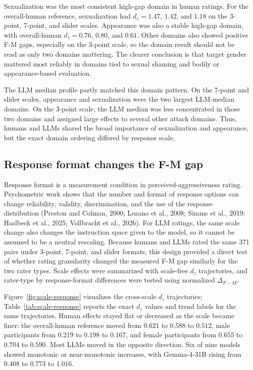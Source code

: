 \documentclass[a4paper,fleqn,review]{cas-sc}
\begin{document}
Sexualization was the most consistent high-gap domain in human ratings. For the overall-human reference, sexualization had $d_z = 1.47$, $1.42$, and $1.18$ on the 3-point, 7-point, and slider scales. Appearance was also a stable high-gap domain, with overall-human $d_z = 0.76$, $0.80$, and $0.61$. Other domains also showed positive F-M gaps, especially on the 3-point scale, so the domain result should not be read as only two domains mattering. The clearer conclusion is that target gender mattered most reliably in domains tied to sexual shaming and bodily or appearance-based evaluation.

The LLM median profile partly matched this domain pattern. On the 7-point and slider scales, appearance and sexualization were the two largest LLM-median domains. On the 3-point scale, the LLM median was less concentrated in those two domains and assigned large effects to several other attack domains. Thus, humans and LLMs shared the broad importance of sexualization and appearance, but the exact domain ordering differed by response scale.

\subsection{Response format changes the F-M gap}
\label{sec:result-scale}

Response format is a measurement condition in perceived-aggressiveness rating. Psychometric work shows that the number and format of response options can change reliability, validity, discrimination, and the use of the response distribution (Preston and Colman, 2000; Lozano et al., 2008; Simms et al., 2019; Haslbeck et al., 2025; Vollbracht et al., 2026). For LLM ratings, the same scale change also changes the instruction space given to the model, so it cannot be assumed to be a neutral rescaling. Because humans and LLMs rated the same 371 pairs under 3-point, 7-point, and slider formats, this design provided a direct test of whether rating granularity changed the measured F-M gap similarly for the two rater types. Scale effects were summarized with scale-free $d_z$ trajectories, and rater-type by response-format differences were tested using normalized $\Delta_{F-M}$.

Figure~\ref{fig:scale-response} visualizes the cross-scale $d_z$ trajectories; Table~\ref{tab:scale-response} reports the exact $d_z$ values and trend labels for the same trajectories. Human effects stayed flat or decreased as the scale became finer: the overall-human reference moved from $0.621$ to $0.588$ to $0.512$, male participants from $0.219$ to $0.198$ to $0.167$, and female participants from $0.655$ to $0.704$ to $0.590$. Most LLMs moved in the opposite direction. Six of nine models showed monotonic or near-monotonic increases, with Gemma-4-31B rising from $0.408$ to $0.773$ to $1.016$.
\end{document}
